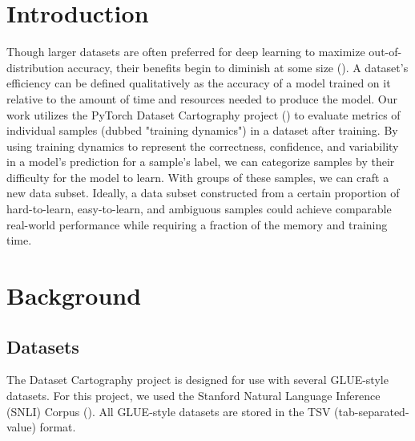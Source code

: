 \documentclass[11pt, a4paper, twocolumn]{article}
\begin{document}
	
	
	\twocolumn[
	\begin{@twocolumnfalse}
		\maketitle
		\begin{abstract}
			\abstracttext
			\newline
			\newline
		\end{abstract}
	\end{@twocolumnfalse}
	]
	
	
	\section{Introduction}
	
	Though larger datasets are often preferred for deep learning to maximize out-of-distribution accuracy, their benefits begin to diminish at some size (\cite{banko-brill-2001-mitigating}). A dataset's efficiency can be defined qualitatively as the accuracy of a model trained on it relative to the amount of time and resources needed to produce the model. Our work utilizes the PyTorch Dataset Cartography project (\cite{swayamdipta2020dataset}) to evaluate metrics of individual samples (dubbed "training dynamics") in a dataset after training. By using training dynamics to represent the correctness, confidence, and variability in a model's prediction for a sample's label, we can categorize samples by their difficulty for the model to learn. With groups of these samples, we can craft a new data subset. Ideally, a data subset constructed from a certain proportion of hard-to-learn, easy-to-learn, and ambiguous samples could achieve comparable real-world performance while requiring a fraction of the memory and training time.
	
	\section{Background}
	
	\subsection{Datasets}
	
	The Dataset Cartography project is designed for use with several GLUE-style datasets. For this project, we used the Stanford Natural Language Inference (SNLI) Corpus (\cite{snli:emnlp2015}). All GLUE-style datasets are stored in the TSV (tab-separated-value) format.
	
\end{document}
